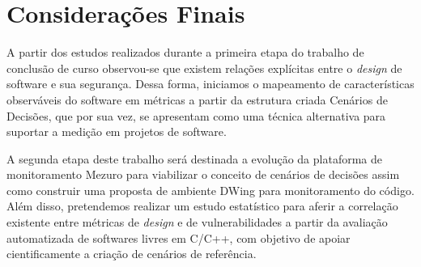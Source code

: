 \section{Considerações Finais}
\label{sec:final-remarkds}

A partir dos estudos realizados durante a primeira etapa do trabalho de conclusão de curso observou-se que existem relações explícitas entre o \emph{design} de software e sua segurança. Dessa forma, iniciamos o mapeamento de características observáveis do software em métricas a partir da estrutura criada Cenários de Decisões, que por sua vez, se apresentam como uma técnica alternativa para suportar a medição em projetos de software.

A segunda etapa deste trabalho será destinada a evolução da plataforma de monitoramento Mezuro para viabilizar o conceito de cenários de decisões assim como construir uma proposta de ambiente DWing para monitoramento do código. Além disso, pretendemos realizar um estudo estatístico para aferir a correlação existente entre métricas de \emph{design} e de vulnerabilidades a partir da avaliação automatizada de softwares livres em C/C++, com objetivo de apoiar cientificamente a criação de cenários de referência.